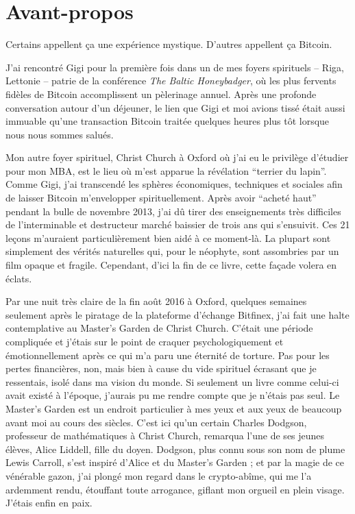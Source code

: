 \chapter*{Avant-propos}

Certains appellent ça une expérience mystique. D'autres appellent ça Bitcoin.

J'ai rencontré Gigi pour la première fois dans un de mes foyers spirituels --
Riga, Lettonie -- patrie de la conférence \textit{The Baltic Honeybadger}, où
les plus fervents fidèles de Bitcoin accomplissent un pèlerinage annuel. Après
une profonde conversation autour d'un déjeuner, le lien que Gigi et moi avions
tissé était aussi immuable qu'une transaction Bitcoin traitée quelques heures
plus tôt lorsque nous nous sommes salués.

Mon autre foyer spirituel, Christ Church à Oxford où j'ai eu le privilège
d'étudier pour mon MBA, est le lieu où m'est apparue la révélation
\enquote{terrier du lapin}. Comme Gigi, j'ai transcendé les sphères économiques,
techniques et sociales afin de laisser Bitcoin m'envelopper spirituellement.
Après avoir \enquote{acheté haut} pendant la bulle de novembre 2013, j'ai dû
tirer des enseignements très difficiles de l'interminable et destructeur marché
baissier de trois ans qui s'ensuivit. Ces 21 leçons m'auraient particulièrement
bien aidé à ce moment-là. La plupart sont simplement des vérités naturelles qui,
pour le néophyte, sont assombries par un film opaque et fragile. Cependant,
d'ici la fin de ce livre, cette façade volera en éclats.

Par une nuit très claire de la fin août 2016 à Oxford, quelques semaines
seulement après le piratage de la plateforme d'échange Bitfinex, j'ai fait une
halte contemplative au Master's Garden de Christ Church. C'était une période
compliquée et j'étais sur le point de craquer psychologiquement et
émotionnellement après ce qui m'a paru une éternité de torture. Pas pour les
pertes financières, non, mais bien à cause du vide spirituel écrasant que je
ressentais, isolé dans ma vision du monde. Si seulement un livre comme celui-ci
avait existé à l'époque, j'aurais pu me rendre compte que je n'étais pas seul.
Le Master’s Garden est un endroit particulier à mes yeux et aux yeux de beaucoup
avant moi au cours des siècles. C'est ici qu'un certain Charles Dodgson,
professeur de mathématiques à Christ Church, remarqua l'une de ses jeunes
élèves, Alice Liddell, fille du doyen. Dodgson, plus connu sous son nom de plume
Lewis Carroll, s'est inspiré d'Alice et du Master's Garden ; et par la magie de
ce vénérable gazon, j'ai plongé mon regard dans le crypto-abîme, qui me l'a
ardemment rendu, étouffant toute arrogance, giflant mon orgueil en plein visage.
J'étais enfin en paix.

